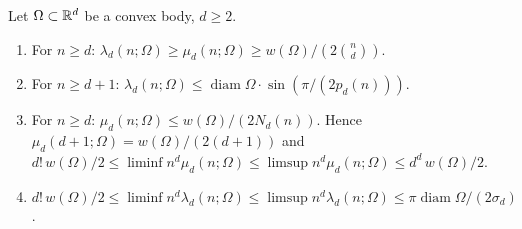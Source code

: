 \documentclass[11pt]{article}
\begin{document}
\begin{proposition}\label{D:convex}
Let $\Omega\subset\mathbb{R}^d$ be a convex body, $d\ge2$.
\begin{enumerate}[label=(\roman*)]
  \item For $n\ge d$: $\lambda_d(n;\Omega)\ge\mu_d(n;\Omega)\ge w(\Omega)/(2\binom nd)$.
  \item For $n\ge d+1$: $\lambda_d(n;\Omega)\le\operatorname{diam}\Omega\cdot\sin(\pi/(2p_d(n)))$.
  \item For $n\ge d$: $\mu_d(n;\Omega)\le w(\Omega)/(2N_d(n))$. Hence $\mu_d(d+1;\Omega)=w(\Omega)/(2(d+1))$ and
    $d!\,w(\Omega)/2\le\liminf n^d\mu_d(n;\Omega)\le\limsup n^d\mu_d(n;\Omega)\le d^d\,w(\Omega)/2$.
  \item $d!\,w(\Omega)/2\le\liminf n^d\lambda_d(n;\Omega)\le\limsup n^d\lambda_d(n;\Omega)\le\pi\operatorname{diam}\Omega/(2\sigma_d)$.
\end{enumerate}
\end{proposition}
\end{document}
